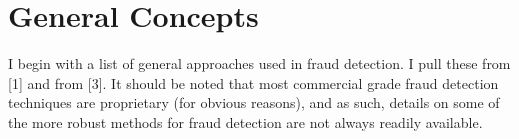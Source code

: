 \documentclass[12pt]{article}
\begin{document}


\bigskip

\section{General Concepts} I begin with a list of general approaches used in fraud detection. I pull these from [1] and from [3]. It should be noted that most commercial grade fraud detection techniques are proprietary (for obvious reasons), and as such, details on some of the more robust methods for fraud detection are not always readily available.  
\end{document}
